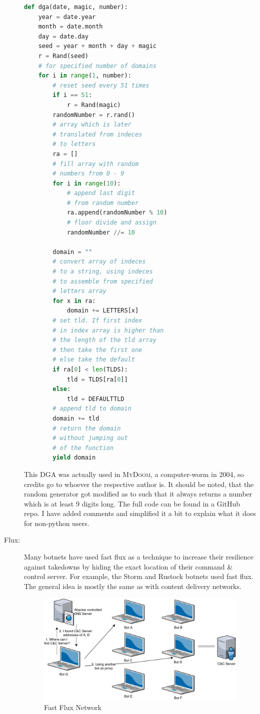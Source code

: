 \documentclass[10pt, a4paper, twocolumn]{article} %
\begin{document}
\begin{description}
\begin{lstlisting}[language=python]
def dga(date, magic, number):
    year = date.year 
    month = date.month
    day = date.day 
    seed = year + month + day + magic
    r = Rand(seed)
    # for specified number of domains
    for i in range(1, number):
        # reset seed every 51 times
        if i == 51:
            r = Rand(magic)
        randomNumber = r.rand() 
        # array which is later
        # translated from indeces 
        # to letters
        ra = []
        # fill array with random 
        # numbers from 0 - 9
        for i in range(10):
            # append last digit 
            # from random number
            ra.append(randomNumber % 10) 
            # floor divide and assign
            randomNumber //= 10

        domain = ""
        # convert array of indeces
        # to a string, using indeces
        # to assemble from specified
        # letters array
        for x in ra:
            domain += LETTERS[x]
        # set tld. If first index 
        # in index array is higher than
        # the length of the tld array
        # then take the first one
        # else take the default
        if ra[0] < len(TLDS):
            tld = TLDS[ra[0]] 
        else:
            tld = DEFAULTTLD
        # append tld to domain
        domain += tld
        # return the domain
        # without jumping out 
        # of the function
        yield domain
\end{lstlisting}
This DGA was actually used in \textsc{MyDoom}, a computer-worm in 2004, so credits go to whoever the respective author is. It should be noted, that the random generator got modified as to such that it always returns a number which is at least 9 digits long. The full code can be found in a GitHub repo\cite{baderj}.  I have added comments and simplified it a bit to explain what it does for non-python users.
\pagebreak
\item[Flux:] %
Many botnets have used fast flux as a technique to increase their resilience against takedowns by hiding the exact location of their command \& control server. For example, the Storm and Rustock botnets used fast flux. The general idea is mostly the same as with content delivery networks\cite{Holz_measuringand}. 
\begin{figure}[ht]
  \centering
  \includegraphics[width=\linewidth]{figures/flux}
  \caption{Fast Flux Network}
\end{figure}


\end{description}
\end{document}
